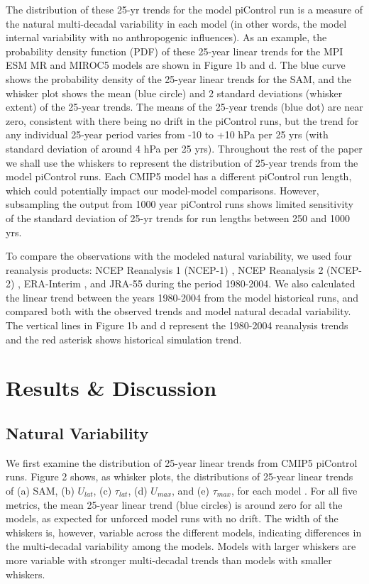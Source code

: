 The distribution of these 25-yr trends for the model piControl run is a measure
of the natural multi-decadal variability in each model (in other words, the
model internal variability with no anthropogenic influences). As an example,
the probability density function (PDF) of these 25-year linear trends for the
MPI ESM MR and MIROC5 models are shown in Figure 1b and d. The blue curve shows
the probability density of the 25-year linear trends for the SAM, and  the
whisker plot shows the mean (blue circle) and 2 standard deviations (whisker
extent) of the 25-year trends.  The means of the 25-year trends (blue dot) are
near zero, consistent with there being no drift in the piControl runs, but the
trend for any individual 25-year period varies from -10 to +10 hPa per 25 yrs
(with standard deviation of around 4 hPa per 25 yrs). Throughout the rest of the
paper we shall use the whiskers to represent the distribution of 25-year trends
from the model piControl runs. Each CMIP5 model has a different piControl run
length, which could potentially impact our model-model comparisons. However,
subsampling the output from 1000 year piControl runs shows limited sensitivity
of the standard deviation of 25-yr trends for run lengths between 250 and 1000
yrs.

To compare the observations with the modeled natural variability, we used four
reanalysis products: NCEP Reanalysis 1 (NCEP-1) \citep{Kalnay1996}, NCEP
Reanalysis 2 (NCEP-2) \citep{Kanamitsu2010}, ERA-Interim \citep{Dee2011},
and JRA-55 \citep{KOBAYASHIa} during the period 1980-2004. We also
calculated the linear trend between the years 1980-2004 from the model
historical runs, and compared both with the observed trends and model natural
decadal variability.  The vertical lines in Figure 1b and d represent the
1980-2004 reanalysis trends and the red asterisk shows historical simulation
trend.

\section{Results \& Discussion}

\subsection{Natural Variability}

We first examine the distribution of 25-year linear trends from CMIP5 piControl
runs. Figure 2 shows, as whisker plots, the distributions of 25-year linear
trends of (a) SAM, (b) $U_{lat}$, (c) $\tau_{lat}$, (d) $U_{max}$, and (e)
$\tau_{max}$, for each model . For all five metrics, the mean 25-year linear
trend (blue circles) is around zero for all the models, as expected for unforced
model runs with no drift. The width of the whiskers is, however, variable across
the different models, indicating differences in the multi-decadal variability
among the models. Models with larger whiskers are more variable with stronger
multi-decadal trends than models with smaller whiskers.

